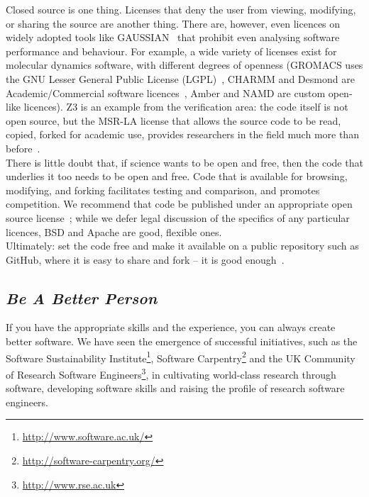 \documentclass[a4paper,11pt]{article}
\begin{document}
Closed source is one thing. Licenses that deny the user from viewing,
modifying, or sharing the source are another thing. There are,
however, even licences on widely adopted tools like
GAUSSIAN~\cite{Giles2004} that prohibit even analysing software
performance and behaviour. For example, a wide variety of licenses
exist for molecular dynamics software, with different degrees of
openness (GROMACS uses the GNU Lesser General Public License
(LGPL)~\cite{Hess2008}, CHARMM and Desmond are Academic/Commercial
software licences~\cite{Brooks2009,Bowers2006}, Amber and NAMD are
custom open-like licences). Z3 is an example from the verification
area: the code itself is not open source, but the MSR-LA license that
allows the source code to be read, copied, forked for academic use,
provides researchers in the field much more than
before~\cite{deMoura2012Z3open}.\\
 
 There is little
doubt that, if science wants to be open and free, then the code that
underlies it too needs to be open and free. Code that is available for
browsing, modifying, and forking facilitates testing and comparison,
and promotes competition. We recommend that code be published under an
appropriate open source license~\cite{osl}; while we defer legal
discussion of the specifics of any particular licences, BSD and Apache are good,
flexible ones.\\

\noindent Ultimately: set the code free and make it available on a public
repository such as GitHub, where it is easy to share and fork -- it is
good enough~\cite{barnes:2010}.

\subsection{{\emph{Be A Better Person}}}

If you have the appropriate skills and the experience, you can always
create better software. We have seen the emergence of successful
initiatives, such as the Software Sustainability
Institute\footnote{\url{http://www.software.ac.uk/}}, Software
Carpentry\footnote{\url{http://software-carpentry.org/}} and the UK
Community of Research Software
Engineers\footnote{\url{http://www.rse.ac.uk}}, in cultivating
world-class research through software, developing software skills and
raising the profile of research software engineers.
\end{document}

